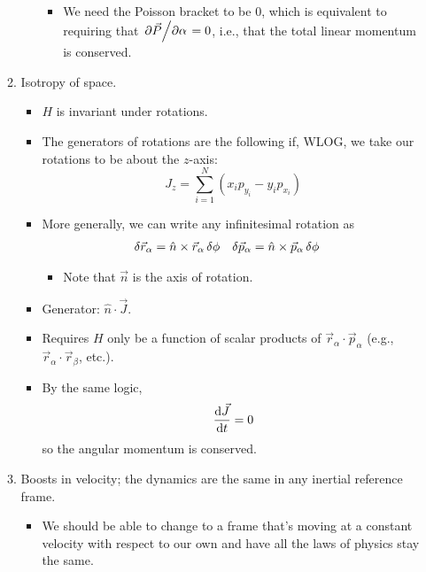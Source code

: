 \documentclass[../notes.tex]{subfiles}
\begin{document}
\begin{itemize}
\begin{enumerate}
\begin{itemize}
\begin{itemize}
                \item We need the Poisson bracket to be 0, which is equivalent to requiring that $\pdv*{\vec{P}}{\alpha}=0$, i.e., that the total linear momentum is conserved.
            \end{itemize}
        \end{itemize}
        \item Isotropy of space.
        \begin{itemize}
            \item $H$ is invariant under rotations.
            \item The generators of rotations are the following if, WLOG, we take our rotations to be about the $z$-axis:
            \begin{equation*}
                J_z = \sum_{i=1}^N(x_ip_{y_i}-y_ip_{x_i})
            \end{equation*}
            \item More generally, we can write any infinitesimal rotation as
            \begin{align*}
                \var{\vec{r}_\alpha} &= \hat{n}\times\vec{r}_\alpha\var{\phi}&
                \var{\vec{p}_\alpha} &= \hat{n}\times\vec{p}_\alpha\var{\phi}
            \end{align*}
            \begin{itemize}
                \item Note that $\vec{n}$ is the axis of rotation.
            \end{itemize}
            \item Generator: $\hat{n}\cdot\vec{J}$.
            \item Requires $H$ only be a function of scalar products of $\vec{r}_\alpha\cdot\vec{p}_\alpha$ (e.g., $\vec{r}_\alpha\cdot\vec{r}_\beta$, etc.).
            \item By the same logic,
            \begin{equation*}
                \dv{\vec{J}}{t} = 0
            \end{equation*}
            so the angular momentum is conserved.
        \end{itemize}
        \item Boosts in velocity; the dynamics are the same in any inertial reference frame.
        \begin{itemize}
            \item We should be able to change to a frame that's moving at a constant velocity with respect to our own and have all the laws of physics stay the same.

\end{itemize}
\end{enumerate}
\end{itemize}
\end{document}
